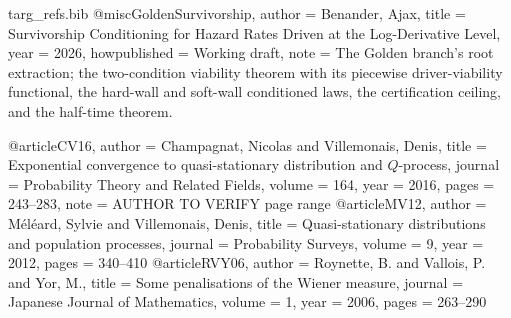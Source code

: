 \begin{filecontents}[overwrite]{targ_refs.bib}
@misc{GoldenSurvivorship,
  author       = {Benander, Ajax},
  title        = {Survivorship Conditioning for Hazard Rates Driven at the Log-Derivative Level},
  year         = {2026},
  howpublished = {Working draft},
  note         = {The Golden branch's root extraction; the two-condition viability
                  theorem with its piecewise driver-viability functional, the
                  hard-wall and soft-wall conditioned laws, the certification
                  ceiling, and the half-time theorem.}
}

@article{CV16,
  author  = {Champagnat, Nicolas and Villemonais, Denis},
  title   = {Exponential convergence to quasi-stationary distribution and {$Q$}-process},
  journal = {Probability Theory and Related Fields},
  volume  = {164},
  year    = {2016},
  pages   = {243--283},
  note    = {AUTHOR TO VERIFY page range}
}
@article{MV12,
  author  = {M{\'e}l{\'e}ard, Sylvie and Villemonais, Denis},
  title   = {Quasi-stationary distributions and population processes},
  journal = {Probability Surveys},
  volume  = {9},
  year    = {2012},
  pages   = {340--410}
}
@article{RVY06,
  author  = {Roynette, B. and Vallois, P. and Yor, M.},
  title   = {Some penalisations of the {W}iener measure},
  journal = {Japanese Journal of Mathematics},
  volume  = {1},
  year    = {2006},
  pages   = {263--290}
}
\end{filecontents}
\documentclass[11pt]{article}
\usepackage[margin=1.1in]{geometry}
\usepackage{amsmath,amssymb,amsthm,mathtools}
\usepackage{booktabs,enumitem,url,xcolor}
\usepackage[colorlinks=true,linkcolor=blue!50!black,citecolor=blue!50!black,urlcolor=blue!50!black]{hyperref}
\usepackage[style=numeric, sorting=none]{biblatex}


